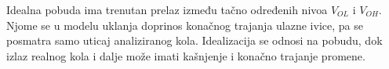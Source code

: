 Idealna pobuda ima trenutan prelaz između tačno određenih nivoa $V_{OL}$ i $V_{OH}$. Njome se u modelu uklanja doprinos konačnog trajanja ulazne ivice, pa se posmatra samo uticaj analiziranog kola. Idealizacija se odnosi na pobudu, dok izlaz realnog kola i dalje može imati kašnjenje i konačno trajanje promene.
